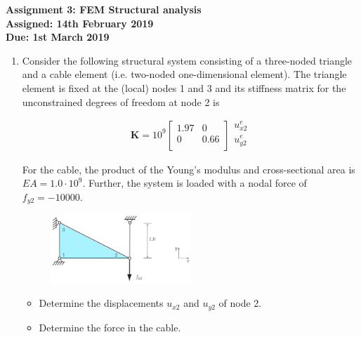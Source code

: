 \documentclass[a4paper,12pt]{article}
\begin{document}
\begin{centering}
	\textbf{
		Assignment 3: FEM Structural analysis\\
		Assigned: 14th February 2019\\
		Due: 1st March 2019\\
	}
\end{centering}

\vspace{1em}
 
\begin{enumerate}

	\item Consider the following structural system consisting of a three-noded triangle and a cable
	element (i.e. two-noded one-dimensional element). The triangle element is fixed at the (local) nodes 1 and 3 and its stiffness matrix for the unconstrained degrees of freedom at node 2 is
	
		\begin{equation*}
			\mathbf{K} = 10^9 %
			\begin{bmatrix}
				1.97	& 0 \\ 
				0 & 0.66 \\
			\end{bmatrix}
			\begin{matrix}
				u_{x2}^e\\ 
				u_{y2}^e \\
			\end{matrix}	
		\end{equation*}
		
		For the cable, the product of the Young’s modulus and cross-sectional area is $EA = 1.0\cdot 10^9$.
		Further, the system is loaded with a nodal force of $f_{y2} = -10000$.
		
		\begin{figure}[!h]
			\centering
			\includegraphics[width=0.5\textwidth]{figs/2d-truss.png}
		\end{figure}
	
		\begin{itemize}
			\item Determine the displacements $u_{x2}$ and $u_{y2}$ of node 2.
			\item Determine the force in the cable.
		\end{itemize}
	

\end{enumerate}
\end{document}
